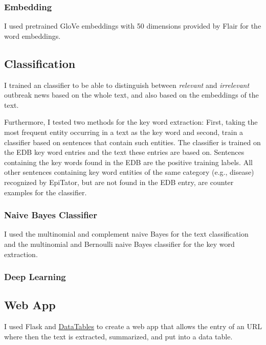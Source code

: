 \subsubsection{Embedding}
I used pretrained GloVe embeddings with 50 dimensions provided by Flair for the word embeddings.

\subsection{Classification}
I trained an classifier to be able to distinguish between \emph{relevant} and \emph{irrelevant} outbreak news based on the whole text, and also based on the embeddings of the text.

Furthermore, I tested two methods for the key word extraction: First, taking the most frequent entity occurring in a text as the key word and second, train a classifier based on sentences that contain such entities. The classifier is trained on the EDB key word entries and the text these entries are based on.
Sentences containing the key words found in the EDB are the positive training labels.
All other sentences containing key word entities of the same category (e.g., disease) recognized by EpiTator, but are not found in the EDB entry, are counter examples for the classifier.

\subsubsection{Naive Bayes Classifier}
I used the multinomial and complement naive Bayes for the text classification and the multinomial and Bernoulli naive Bayes classifier for the key word extraction.

\subsubsection{Deep Learning}

\subsection{Web App}
I used Flask and \href{https://www.datatables.net}{DataTables} to create a web app that allows the entry of an URL where then the text is extracted, summarized, and put into a data table.
